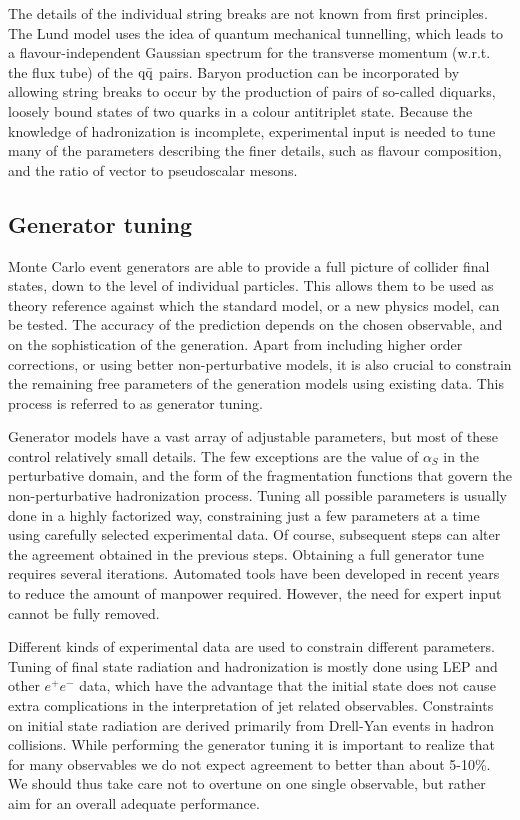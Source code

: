The details of the individual string breaks are not known from first principles. The Lund model
uses the idea of quantum mechanical tunnelling, which leads to a flavour-independent
Gaussian spectrum for the transverse momentum (w.r.t. the flux tube) of the $\mathrm{q} \bar{\mathrm{q}}$ pairs.
Baryon production can be incorporated by allowing string breaks to occur by the production of
pairs of so-called diquarks, loosely bound states of two quarks in a colour antitriplet state. 
Because the knowledge of hadronization is incomplete, experimental input is needed to tune many of
the parameters describing the finer details, such as flavour composition, and the ratio of vector to
pseudoscalar mesons. 


\subsection{Generator tuning}

Monte Carlo event generators are able to provide a full picture of collider final states, down to
the level of individual particles. This allows them to be used as theory reference against which
the standard model, or a new physics model, can be tested. The accuracy of the prediction depends
on the chosen observable, and on the sophistication of the generation. 
Apart from including higher order corrections, or using better non-perturbative models, it is also
crucial to constrain the remaining free parameters of the generation models using existing data.
This process is referred to as generator tuning. 

Generator models have a vast array of adjustable parameters, but most of these control relatively
small details. The few exceptions are the value of $\alpha_S$ in the perturbative domain, and the
form of the fragmentation functions that govern the non-perturbative hadronization process. 
Tuning all possible parameters is usually done in a highly factorized way, constraining just a few
parameters at a time using carefully selected experimental data. 
Of course, subsequent steps can alter the agreement obtained in the previous steps. Obtaining a
full generator tune requires several iterations. 
Automated tools have been developed in recent years to reduce the amount of manpower required.
However, the need for expert input cannot be fully removed. 

Different kinds of experimental data are used to constrain different parameters. Tuning of final
state radiation and hadronization is mostly done using LEP and other $e^+ e^-$ data,  which have
the advantage that the initial state does not cause extra complications in the interpretation of jet
related observables. Constraints on initial state radiation are derived primarily from Drell-Yan
events in hadron collisions. 
While performing the generator tuning it is important to realize that for many observables we do
not expect agreement to better than about 5-10\%. We should thus take care not to overtune on one
single observable, but rather aim for an overall adequate performance. 


